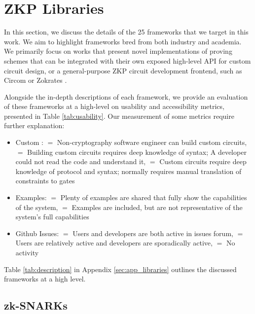 \section{ZKP Libraries} 
\label{sec:libraries}

In this section, we discuss the details of the 25 frameworks that we target in this work. We aim to highlight frameworks bred from both industry and academia. We primarily focus on works that present novel implementations of proving schemes that can be integrated with their own exposed high-level API for custom circuit design, or a general-purpose ZKP circuit development frontend, such as Circom \cite{munoz2022circom} or Zokrates \cite{eberhardt2018zokrates}.

Alongside the in-depth descriptions of each framework, we provide an evaluation of these frameworks at a high-level on usability and accessibility metrics, presented in Table \ref{tab:usability}. Our measurement of some metrics require further explanation:
\begin{itemize}
    \item Custom \Cir: \fullcirc $=$ Non-cryptography software engineer can build custom circuits, \halfcirc $=$ Building custom circuits requires deep knowledge of syntax; A developer could not read the code and understand it, \emptycirc $=$ Custom circuits require deep knowledge of protocol and syntax; normally requires manual translation of constraints to gates
    \item Examples: \fullcirc$=$ Plenty of examples are shared that fully show the capabilities of the system, \halfcirc $=$ Examples are included, but are not representative of the system's full capabilities
    \item Github Issues: \fullcirc $=$ Users and developers are both active in issues forum, \halfcirc $=$ Users are relatively active and developers are sporadically active, \emptycirc $=$ No activity
\end{itemize}

Table \ref{tab:description} in Appendix \ref{sec:app_libraries} outlines the discussed frameworks at a high level.




\subsection{zk-SNARKs}

